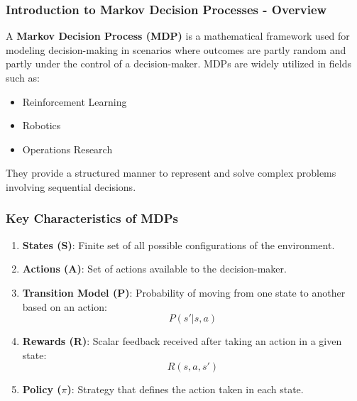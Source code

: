 \documentclass[aspectratio=169]{beamer}
\begin{document}
\frame{\titlepage}

\begin{frame}[fragile]
    \frametitle{Introduction to Markov Decision Processes - Overview}

    A \textbf{Markov Decision Process (MDP)} is a mathematical framework used for modeling decision-making in scenarios where outcomes are partly random and partly under the control of a decision-maker. 
    MDPs are widely utilized in fields such as:
    
    \begin{itemize}
        \item Reinforcement Learning
        \item Robotics
        \item Operations Research
    \end{itemize}

    They provide a structured manner to represent and solve complex problems involving sequential decisions.
\end{frame}

\begin{frame}[fragile]
    \frametitle{Key Characteristics of MDPs}

    \begin{enumerate}
        \item \textbf{States (S)}: Finite set of all possible configurations of the environment.
        \item \textbf{Actions (A)}: Set of actions available to the decision-maker.
        \item \textbf{Transition Model (P)}: Probability of moving from one state to another based on an action: 
            \begin{equation}
                P(s' | s, a)
            \end{equation}
        \item \textbf{Rewards (R)}: Scalar feedback received after taking an action in a given state:
            \begin{equation}
                R(s, a, s')
            \end{equation}
        \item \textbf{Policy ($\pi$)}: Strategy that defines the action taken in each state.
    \end{enumerate}
\end{frame}
\end{document}
